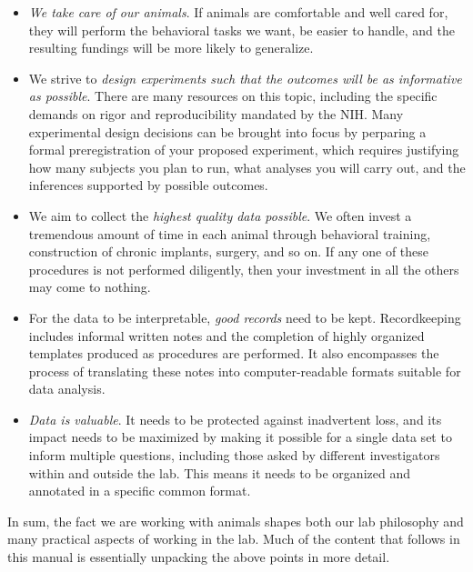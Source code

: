 \documentclass{tufte-book}
\begin{document}
\begin{itemize}

\item{{\it We take care of our animals}. If animals are comfortable and well
  cared for, they will perform the behavioral tasks we want, be easier
  to handle, and the resulting fundings will be more likely to generalize.}

\item{We strive to {\it design experiments such that the outcomes will be
  as informative as possible}. There are many resources on this topic,
  including the specific demands on rigor and reproducibility mandated
  by the NIH. Many experimental design
  decisions can be brought into focus by perparing a formal
  preregistration of your proposed
  experiment, which requires justifying how
  many subjects you plan to run, what analyses you will carry out, and
  the inferences supported by possible outcomes.}

\item{We aim to collect the {\it highest quality data possible}. We
  often invest a tremendous amount of time in each animal through
  behavioral training, construction of chronic implants, surgery, and
  so on. If any one of these procedures is not performed diligently,
  then your investment in all the others may come to nothing.}

\item{For the data to be interpretable, {\it good records} need to be
  kept. Recordkeeping includes informal written notes and the
  completion of highly organized templates produced as procedures are
  performed. It also encompasses the process of translating these
  notes into computer-readable formats suitable for data analysis.}

\item{{\it Data is valuable}. It needs to be protected against inadvertent
  loss, and its impact needs to be maximized by making it possible for
  a single data set to inform multiple questions, including those
  asked by different investigators within and outside the lab. This
  means it needs to be organized and annotated in a specific common
  format.}
\end{itemize}

In sum, the fact we are working with animals shapes both our lab
philosophy and many practical aspects of working in the lab. Much of
the content that follows in this manual is essentially unpacking the
above points in more detail.
\end{document}
